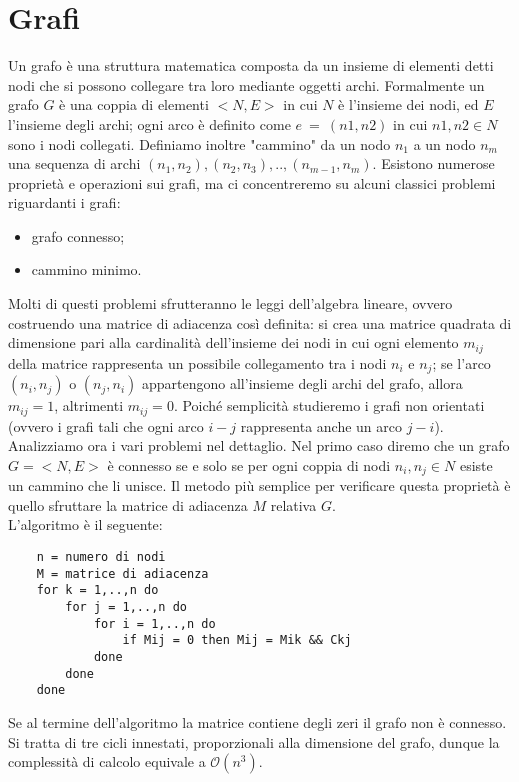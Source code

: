 \section{Grafi}
Un grafo è una struttura matematica composta da un insieme di elementi detti nodi che si possono collegare tra loro mediante oggetti archi. Formalmente un grafo $G$ è una coppia di elementi $<N, E>$ in cui $N$ è l'insieme dei nodi, ed $E$ l'insieme degli archi; ogni arco è definito come $e \ = \ (n1,n2)$ in cui $n1,n2 \in N$ sono i nodi collegati. Definiamo inoltre "cammino" da un nodo $n_1$ a un nodo $n_m$ una sequenza di archi $(n_1,n_2),(n_2,n_3),..,(n_{m-1}, n_m)$.
\newpage
\noindent Esistono numerose proprietà e operazioni sui grafi, ma ci concentreremo su alcuni classici problemi riguardanti i grafi:
\begin{itemize}
\item{grafo connesso;}
\item{cammino minimo.}
\end{itemize}
Molti di questi problemi sfrutteranno le leggi dell'algebra lineare, ovvero costruendo una matrice di adiacenza così definita: si crea una matrice quadrata di dimensione pari alla cardinalità dell'insieme dei nodi in cui ogni elemento $m_{ij}$ della matrice rappresenta un possibile collegamento tra i nodi $n_i$ e $n_j$; se l'arco $(n_i,n_j)$ o $(n_j,n_i)$ appartengono all'insieme degli archi del grafo, allora $m_{ij} = 1$, altrimenti $m_{ij} = 0$. Poiché semplicità studieremo i grafi non orientati (ovvero i grafi tali che ogni arco $i-j$ rappresenta anche un arco $j-i$).\\
Analizziamo ora i vari problemi nel dettaglio. Nel primo caso diremo che un grafo $G = <N, E>$ è connesso se e solo se per ogni coppia di nodi $n_i, n_j \in N$ esiste un cammino che li unisce. Il metodo più semplice per verificare questa proprietà è quello sfruttare la matrice di adiacenza $M$ relativa $G$. \\
L'algoritmo è il seguente:
\begin{verbatim}
    n = numero di nodi
    M = matrice di adiacenza
    for k = 1,..,n do
        for j = 1,..,n do
            for i = 1,..,n do
                if Mij = 0 then Mij = Mik && Ckj
            done
        done
    done
\end{verbatim}
\newpage
\noindent Se al termine dell'algoritmo la matrice contiene degli zeri il grafo non è connesso.\\
Si tratta di tre cicli innestati, proporzionali alla dimensione del grafo, dunque la complessità di calcolo equivale a $\mathcal{O}(n^3)$.\\
